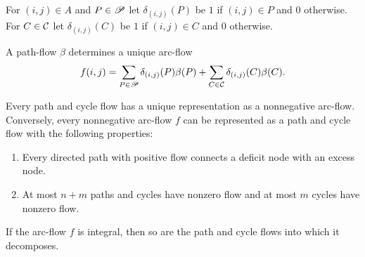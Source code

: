   For $(i,j)\in A$ and $P \in \mathscr{P}$ let $\delta_{(i,j)}(P)$ be $1$ if $(i,j) \in
  P$ and $0$ otherwise. For $C \in \mathcal{C}$ let $\delta_{(i,j)}(C)$ be $1$ if
  $(i,j)\in C$ and $0$ otherwise. 

  A path-flow $\beta$ determines a unique   arc-flow
  \begin{displaymath}
    f(i,j) = \sum_{P \in \mathscr{P}} \delta_{(i,j)}(P) \beta(P) + \sum_{C \in \mathcal{C}} \delta_{(i,j)}(C) \beta(C). 
  \end{displaymath}
    

  
  \begin{theorem}
    \label{f:thr:Decomp}
    Every path and cycle flow  has a unique representation
    as a  nonnegative arc-flow. Conversely, every nonnegative arc-flow
    $f$ can be represented as a path and cycle flow with the following
    properties:
    \begin{enumerate}
    \item Every directed path with positive flow connects a deficit
      node with an excess node.
    \item At most $n+m$ paths and cycles have nonzero flow and at most
      $m$ cycles have nonzero flow.
    \end{enumerate}
    If the arc-flow $f$ is integral, then so are the path and cycle
    flows into which it decomposes. 
  \end{theorem}

